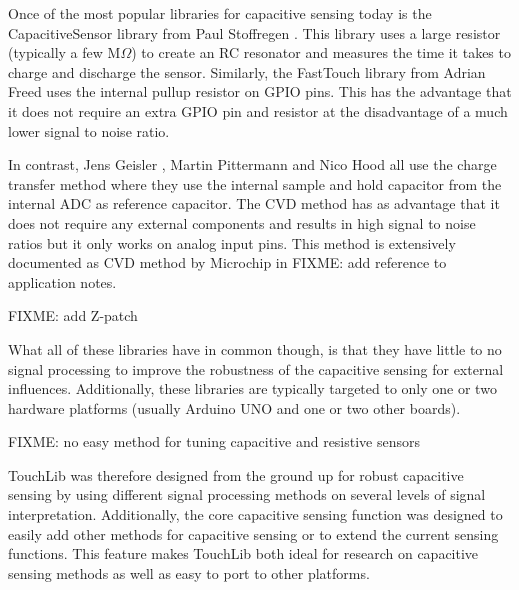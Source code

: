 \documentclass[format=sigchi, screen=true, review=true]{acmart}
\begin{document}
Once of the most popular libraries for capacitive sensing today is the
CapacitiveSensor library from Paul Stoffregen \cite{CapacitiveSensorWebsite}.
This library uses a large resistor (typically a few $\textrm{M}\Omega$) to
create an RC resonator and measures the time it takes to charge and discharge
the sensor. Similarly, the FastTouch library from Adrian Freed
\cite{FastTouchWebsite} uses the internal pullup resistor on GPIO pins. This
has the advantage that it does not require an extra GPIO pin and resistor at
the disadvantage of a much lower signal to noise ratio.

In contrast, Jens Geisler \cite{QTouchADCArduinoWebsite}, Martin Pittermann
\cite{ADCTouchWebsite} and Nico Hood \cite{AnalogTouch} all use the charge
transfer method where they use the internal sample and hold capacitor from the
internal ADC as reference capacitor. The CVD method has as advantage that it
does not require any external components and results in high signal to noise
ratios but it only works on analog input pins. This method is extensively
documented as CVD method by Microchip in FIXME: add reference to application
notes.

FIXME: add Z-patch

What all of these libraries have in common though, is that they have little to
no signal processing to improve the robustness of the capacitive sensing for
external influences. Additionally, these libraries are typically targeted to
only one or two hardware platforms (usually Arduino UNO and one or two other
boards).

FIXME: no easy method for tuning capacitive and resistive sensors

TouchLib was therefore designed from the ground up for robust capacitive
sensing by using different signal processing methods on several levels of
signal interpretation. Additionally, the core capacitive sensing function was
designed to easily add other methods for capacitive sensing or to extend the
current sensing functions. This feature makes TouchLib both ideal for research
on capacitive sensing methods as well as easy to port to other platforms.
\end{document}

